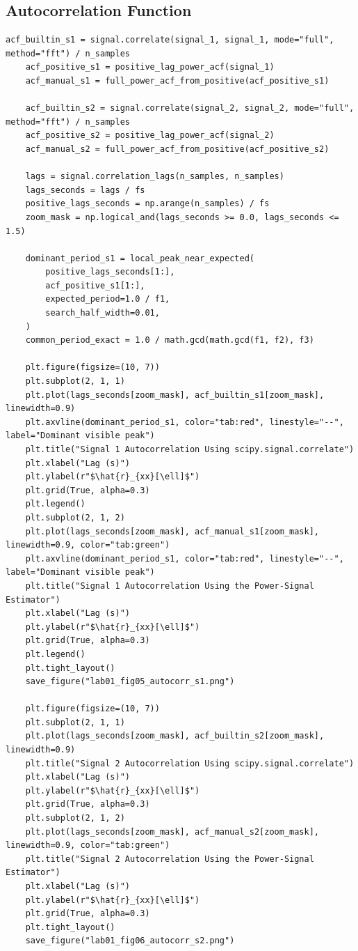 \documentclass[12pt, a4paper]{article}
\begin{document}
\subsection{Autocorrelation Function}
\begin{lstlisting}[caption={Autocorrelation estimators for Signal 1 and Signal 2.}, label={lst:lab01_acf}]
    acf_builtin_s1 = signal.correlate(signal_1, signal_1, mode="full", method="fft") / n_samples
    acf_positive_s1 = positive_lag_power_acf(signal_1)
    acf_manual_s1 = full_power_acf_from_positive(acf_positive_s1)

    acf_builtin_s2 = signal.correlate(signal_2, signal_2, mode="full", method="fft") / n_samples
    acf_positive_s2 = positive_lag_power_acf(signal_2)
    acf_manual_s2 = full_power_acf_from_positive(acf_positive_s2)

    lags = signal.correlation_lags(n_samples, n_samples)
    lags_seconds = lags / fs
    positive_lags_seconds = np.arange(n_samples) / fs
    zoom_mask = np.logical_and(lags_seconds >= 0.0, lags_seconds <= 1.5)

    dominant_period_s1 = local_peak_near_expected(
        positive_lags_seconds[1:],
        acf_positive_s1[1:],
        expected_period=1.0 / f1,
        search_half_width=0.01,
    )
    common_period_exact = 1.0 / math.gcd(math.gcd(f1, f2), f3)

    plt.figure(figsize=(10, 7))
    plt.subplot(2, 1, 1)
    plt.plot(lags_seconds[zoom_mask], acf_builtin_s1[zoom_mask], linewidth=0.9)
    plt.axvline(dominant_period_s1, color="tab:red", linestyle="--", label="Dominant visible peak")
    plt.title("Signal 1 Autocorrelation Using scipy.signal.correlate")
    plt.xlabel("Lag (s)")
    plt.ylabel(r"$\hat{r}_{xx}[\ell]$")
    plt.grid(True, alpha=0.3)
    plt.legend()
    plt.subplot(2, 1, 2)
    plt.plot(lags_seconds[zoom_mask], acf_manual_s1[zoom_mask], linewidth=0.9, color="tab:green")
    plt.axvline(dominant_period_s1, color="tab:red", linestyle="--", label="Dominant visible peak")
    plt.title("Signal 1 Autocorrelation Using the Power-Signal Estimator")
    plt.xlabel("Lag (s)")
    plt.ylabel(r"$\hat{r}_{xx}[\ell]$")
    plt.grid(True, alpha=0.3)
    plt.legend()
    plt.tight_layout()
    save_figure("lab01_fig05_autocorr_s1.png")

    plt.figure(figsize=(10, 7))
    plt.subplot(2, 1, 1)
    plt.plot(lags_seconds[zoom_mask], acf_builtin_s2[zoom_mask], linewidth=0.9)
    plt.title("Signal 2 Autocorrelation Using scipy.signal.correlate")
    plt.xlabel("Lag (s)")
    plt.ylabel(r"$\hat{r}_{xx}[\ell]$")
    plt.grid(True, alpha=0.3)
    plt.subplot(2, 1, 2)
    plt.plot(lags_seconds[zoom_mask], acf_manual_s2[zoom_mask], linewidth=0.9, color="tab:green")
    plt.title("Signal 2 Autocorrelation Using the Power-Signal Estimator")
    plt.xlabel("Lag (s)")
    plt.ylabel(r"$\hat{r}_{xx}[\ell]$")
    plt.grid(True, alpha=0.3)
    plt.tight_layout()
    save_figure("lab01_fig06_autocorr_s2.png")
\end{lstlisting}
\end{document}
